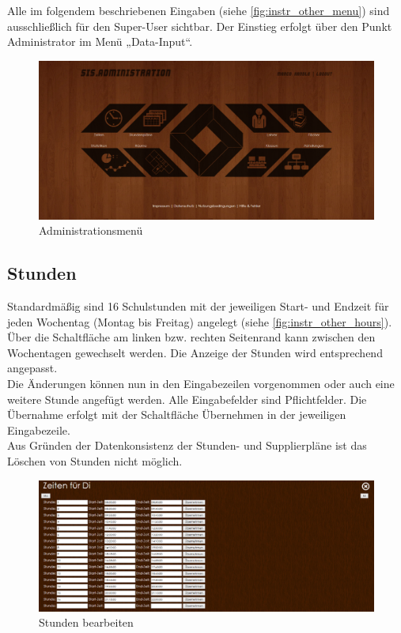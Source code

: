 Alle im folgendem beschriebenen Eingaben (siehe \autoref{fig:instr_other_menu}) sind ausschließlich für den Super-User sichtbar. Der Einstieg erfolgt über den Punkt Administrator im Menü „Data-Input“.
\begin{figure}[H]
\centering
\includegraphics[keepaspectratio=true, width=17cm]{images/screenshots/admin_menu.png}
\caption{Administrationsmenü}
\label{fig:instr_other_menu}
\end{figure}
\subsection{Stunden}\label{sec:instr_other_hours}
Standardmäßig sind 16 Schulstunden mit der jeweiligen Start- und Endzeit für jeden Wochentag (Montag bis Freitag) angelegt (siehe \autoref{fig:instr_other_hours}). Über die Schaltfläche am linken bzw. rechten Seitenrand kann zwischen den Wochentagen gewechselt werden. Die Anzeige der Stunden wird entsprechend angepasst.\\
Die Änderungen können nun in den Eingabezeilen vorgenommen oder auch eine weitere Stunde angefügt werden. Alle Eingabefelder sind Pflichtfelder. Die Übernahme erfolgt mit der Schaltfläche Übernehmen in der jeweiligen Eingabezeile.\\
Aus Gründen der Datenkonsistenz der Stunden- und Supplierpläne ist das Löschen von Stunden nicht möglich.
\begin{figure}[H]
\centering
\includegraphics[keepaspectratio=true, width=17cm]{images/screenshots/hours_input.png}
\caption{Stunden bearbeiten}
\label{fig:instr_other_hours}
\end{figure}
